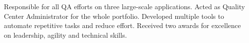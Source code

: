 \begin{entrylist}
{      Responsible for all QA efforts on three large-scale applications. Acted as Quality Center Administrator for the whole portfolio. Developed multiple tools to automate repetitive tasks and reduce effort. Received two awards for excellence on leadership, agility and technical skills.
    }
\end{entrylist}
